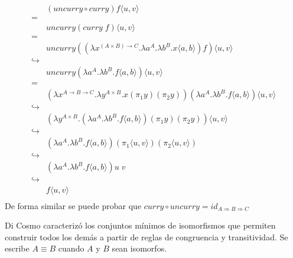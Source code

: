 \begin{align*}
	& (uncurry \circ curry) f \langle u,v \rangle \\
	=& \\
	& uncurry (curry \; f) \langle u,v \rangle \\
	=& \\
	& uncurry ((\lambda x^{(A \times B) \rightarrow C}. \lambda a^A . \lambda b^B . x\langle a,b \rangle) f)  \langle u,v \rangle \\
	\hookrightarrow& \\
	& uncurry (\lambda a^A . \lambda b^B . f\langle a,b \rangle)  \langle u,v \rangle \\
	=& \\
	& (\lambda x^{A \rightarrow B \rightarrow C}. \lambda y^{A \times B} . x(\pi_1 y)(\pi_2 y)) (\lambda a^A . \lambda b^B . f\langle a,b \rangle)  \langle u,v \rangle \\
	\hookrightarrow& \\
	& (\lambda y^{A \times B} . (\lambda a^A . \lambda b^B . f\langle a,b \rangle)(\pi_1 y)(\pi_2 y)) \langle u,v \rangle \\
	\hookrightarrow& \\
	& (\lambda a^A . \lambda b^B . f\langle a,b \rangle)(\pi_1 \langle u,v \rangle)(\pi_2 \langle u,v \rangle) \\
	\hookrightarrow& \\
	& (\lambda a^A . \lambda b^B . f\langle a,b \rangle) u \; v \\
	\hookrightarrow& \\
	& f\langle u,v \rangle \\
\end{align*}
De forma similar se puede probar que $curry \circ uncurry = id_{A \Rightarrow B \Rightarrow C}$

Di Cosmo \cite{MSCSSurvey05} caracterizó los conjuntos mínimos de isomorfismos que permiten construir todos los demás a partir de reglas de congruencia y transitividad.
Se escribe $A \equiv B$ cuando $A$ y $B$ sean isomorfos.

